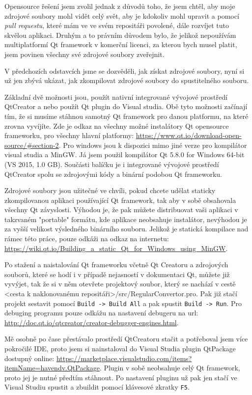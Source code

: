 Opensource řešení jsem zvolil jednak z důvodů toho, že jsem chtěl, aby moje zdrojové soubory mohl vidět celý svět, aby je kdokoliv mohl upravit a pomocí \textit{pull requestu}, které mám ve ve svém repositáři povolené, dále rozvíjet tuto skvělou aplikaci. Druhým a to právním důvodem bylo, že jelikož nepoužívám multiplatformí Qt framework v komerční licenci, za kterou bych musel platit, jsem povinen všechny své zdrojové soubory zveřejnit.

V předchozích odstavcích jsme se dozvěděli, jak získat zdrojové soubory, nyní si už jen zbývá ukázat, jak zkompilovat zdrojové soubory do spustitelného souboru. 

Základní dvě možnosti jsou, použít nativní integrované vývojové prostředí QtCreator a nebo použít Qt plugin do Visual studia. Obě tyto možnosti začínají tím, že si musíme stáhnou samotný Qt framework pro danou platformu, na které zrovna vyvíjíte. Zde je odkaz na všechny možné instalátory Qt opensource frameworku, pro všechny hlavní platformy: \url{https://www.qt.io/download-open-source/#section-2}. Pro windows jsou k dispozici mimo jiné verze pro kompilátor visual studia a MinGW. Já jsem použil kompilátor Qt 5.8.0 for Windows 64-bit (VS 2015, 1.0 GB). Součásti balíčku je i integrované vývojové prostředí QtCreator spolu se zdrojovými kódy a binární podobou Qt frameworku. 

Zdrojové soubory jsou užitečné ve chvíli, pokud chcete udělat staticky zkompilovanou aplikaci používající Qt framework, tak aby v sobě obsahovala všechny Qt závyslosti. Výhodou je, že pak můžete distribuovat vaši aplikaci v takzvaném "portable" formátu, kde aplikace neobsahuje instalátor, nevýhodou je za vyšší velikost výsledného binárního souboru. Jelikož je statická kompilace nad rámec této práce, pouze odkáži na odkaz na internetu: \url{https://wiki.qt.io/Building_a_static_Qt_for_Windows_using_MinGW}.

Po stažení a naistalování Qt frameworku včetně Qt Creatoru a zdrojových souborů, které se hodí i v případě nejasností v dokumentaci Qt, můžete již vyvýjet, tak že si v něm otevřete projektový soubor, který se nachází v cestě <cesta k naklonovanému repositáři>/src/RegularConvertor.pro. Pak již stačí projekt sestavit pomocí \texttt{Build -> Build All} a pak spustit \texttt{Build -> Run}. Pro debuging programu pouze odkážu na nastavení debugeru na url: \url{http://doc.qt.io/qtcreator/creator-debugger-engines.html}.   

Mě osobně po čase přestávalo prostředí QtCreatoru stačit a potřeboval jsem více pokročilé IDE, proto jsem si nainstaloval do Visual Studia plugin QtPackage dostupný online: \url{https://marketplace.visualstudio.com/items?itemName=havendv.QtPackage}. Plugin v sobě neobsahuje celý Qt framework, proto jej je nutné předtím stáhnout. Po nastavení pluginu už pak jen stačí ve Visual Studiu spustit a zbuildit pomocí klávesové zkratky \texttt{F5}.

